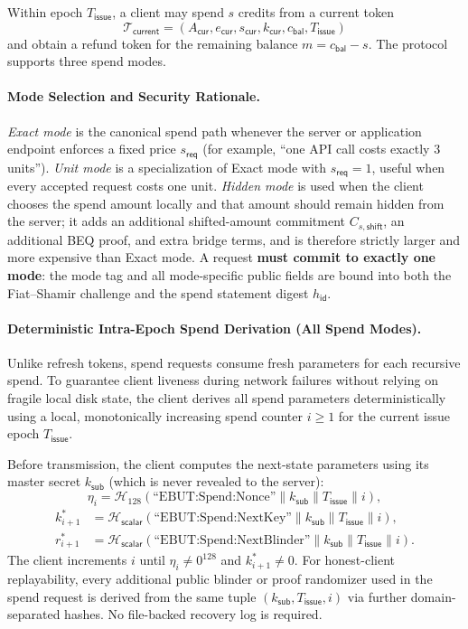 \documentclass[11pt]{article}
\theoremstyle{definitionstyle}
\theoremstyle{plain}
\begin{document}
Within epoch $T_{\mathsf{issue}}$, a client may spend $s$ credits from a current token
\[
\mathcal{T}_{\mathsf{current}} = (A_{\mathsf{cur}}, e_{\mathsf{cur}}, s_{\mathsf{cur}}, k_{\mathsf{cur}}, c_{\mathsf{bal}}, T_{\mathsf{issue}})
\]
and obtain a refund token for the remaining balance $m = c_{\mathsf{bal}} - s$.
The protocol supports three spend modes.

\paragraph{Mode Selection and Security Rationale.}
\emph{Exact mode} is the canonical spend path whenever the server or application endpoint enforces a fixed price $s_{\mathsf{req}}$ (for example, ``one API call costs exactly 3 units''). \emph{Unit mode} is a specialization of Exact mode with $s_{\mathsf{req}}=1$, useful when every accepted request costs one unit. \emph{Hidden mode} is used when the client chooses the spend amount locally and that amount should remain hidden from the server; it adds an additional shifted-amount commitment $C_{s,\mathsf{shift}}$, an additional BEQ proof, and extra bridge terms, and is therefore strictly larger and more expensive than Exact mode. A request \textbf{must commit to exactly one mode}: the mode tag and all mode-specific public fields are bound into both the Fiat--Shamir challenge and the spend statement digest $h_{\mathsf{id}}$.

\paragraph{Deterministic Intra-Epoch Spend Derivation (All Spend Modes).}
Unlike refresh tokens, spend requests consume fresh parameters for each recursive spend. To guarantee client liveness during network failures without relying on fragile local disk state, the client derives all spend parameters deterministically using a local, monotonically increasing spend counter $i \ge 1$ for the current issue epoch $T_{\mathsf{issue}}$.

Before transmission, the client computes the next-state parameters using its master secret $k_{\mathsf{sub}}$ (which is never revealed to the server):
\[
\eta_i = \mathcal{H}_{128}(\text{``EBUT:Spend:Nonce''} \parallel k_{\mathsf{sub}} \parallel T_{\mathsf{issue}} \parallel i),
\]
\begin{align*}
k_{i+1}^* &= \mathcal{H}_{\mathsf{scalar}}(\text{``EBUT:Spend:NextKey''} \parallel k_{\mathsf{sub}} \parallel T_{\mathsf{issue}} \parallel i), \\
r_{i+1}^* &= \mathcal{H}_{\mathsf{scalar}}(\text{``EBUT:Spend:NextBlinder''} \parallel k_{\mathsf{sub}} \parallel T_{\mathsf{issue}} \parallel i).
\end{align*}
The client increments $i$ until $\eta_i \neq 0^{128}$ and $k_{i+1}^* \neq 0$. For honest-client replayability, every additional public blinder or proof randomizer used in the spend request is derived from the same tuple $(k_{\mathsf{sub}}, T_{\mathsf{issue}}, i)$ via further domain-separated hashes. No file-backed recovery log is required.
\end{document}
